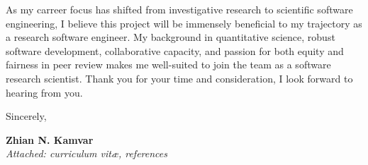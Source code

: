 \vspace{1ex}

As my carreer focus has shifted from investigative research to scientific
software engineering, I believe this project will be immensely beneficial to my
trajectory as a research software engineer. My background in quantitative
science, robust software development, collaborative capacity, and passion for
both equity and fairness in peer review makes me well-suited to join the team
as a software research scientist. Thank you for your time and consideration, I
look forward to hearing from you. 

\vspace{2ex}

Sincerely,

\vspace{5ex}

\textbf{Zhian N. Kamvar}\\
\textit{Attached: curriculum vit\ae{}, references}



\clearpage
